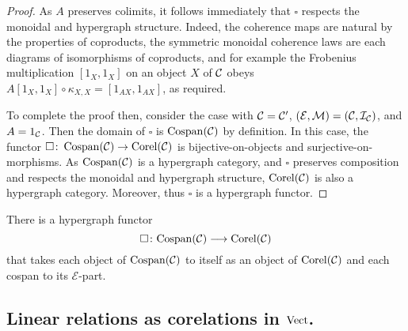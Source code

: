\begin{proof}
  As $A$ preserves colimits, it follows immediately that $\square$ respects the
  monoidal and hypergraph structure. Indeed, the coherence maps are natural by
  the properties of coproducts, the symmetric monoidal coherence laws are each
  diagrams of isomorphisms of coproducts, and for example the Frobenius
  multiplication $[1_X,1_X]$ on an object $X$ of $\mathcal C$ obeys $A[1_X,1_X] \circ
  \kappa_{X,X}= [1_{AX},1_{AX}]$, as required. 
  
  To complete the proof then, consider the case with $\mathcal C = \mathcal C'$, $(\mathcal
  E,\mathcal M) = (\mathcal C, \mathcal I_{\mathcal C})$, and $A = 1_{\mathcal C}$. Then the domain of
  $\square$ is $\operatorname{{Cospan}}(\mathcal C)$ by definition. In this case, the functor
  $\square{\colon} \operatorname{{Cospan}}(\mathcal C) \to \operatorname{{Corel}}(\mathcal C)$ is bijective-on-objects and
  surjective-on-morphisms. As $\operatorname{{Cospan}}(\mathcal C)$ is a hypergraph category, and
  $\square$ preserves composition and respects the monoidal and hypergraph
  structure, $\operatorname{{Corel}}(\mathcal C)$ is also a hypergraph category. Moreover, thus
  $\square$ is a hypergraph functor.
\end{proof}

\begin{corollary}
  There is a hypergraph functor 
  \[
    \square{\colon} \mathrm{Cospan}(\mathcal C) \longrightarrow \mathrm{Corel}(\mathcal C)
  \]
  that takes each object of $\operatorname{{Cospan}}(\mathcal C)$ to itself as an object of
  $\operatorname{{Corel}}(\mathcal C)$ and each cospan to its $\mathcal E$-part.
\end{corollary}


\subsection{Linear relations as corelations in $\mathrm{Vect}$.}

